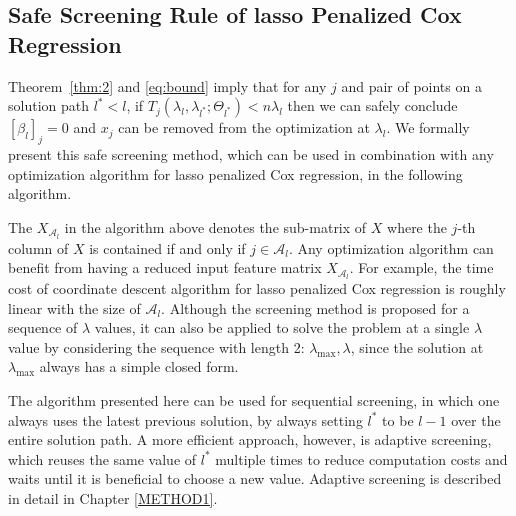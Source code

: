 \subsection{Safe Screening Rule of lasso Penalized Cox Regression}

Theorem~\ref{thm:2} and \eqref{eq:bound} imply that for any $j$ and pair of points on a solution path $l^*<l$, if $T_j(\lambda_{l},\lambda_{l^*};\Theta_{l^*})<n\lambda_l$ then we can safely conclude $[\beta_l]_{j}=0$ and $x_j$ can be removed from the optimization at $\lambda_l$. We formally present this safe screening method, which can be used in combination with any optimization algorithm for lasso penalized Cox regression, in the following algorithm.

\begin{algorithm}[H]

    
\end{algorithm}

The $X_{\mathcal{A}_l}$ in the algorithm above denotes the sub-matrix of $X$ where the $j$-th column of $X$ is contained if and only if $j\in{\mathcal{A}_l}$. Any optimization algorithm can benefit from having a reduced input feature matrix $X_{\mathcal{A}_l}$. For example, the time cost of coordinate descent algorithm for lasso penalized Cox regression \citep{simon2011regularization} is roughly linear with the size of $\mathcal{A}_l$. Although the screening method is proposed for a sequence of $\lambda$ values, it can also be applied to solve the problem at a single $\lambda$ value by considering the sequence with length 2: $\lambda_{\max},\lambda$, since the solution at $\lambda_{\max}$ always has a simple closed form.

The algorithm presented here can be used for sequential screening, in which one always uses the latest previous solution, by always setting $l^*$ to be $l-1$ over the entire solution path. A more efficient approach, however, is adaptive screening, which reuses the same value of $l^*$ multiple times to reduce computation costs and waits until it is beneficial to choose a new value. Adaptive screening is described in detail in Chapter \ref{METHOD1}.

